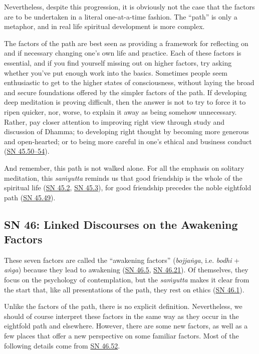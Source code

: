\documentclass[12pt,openany]{book}%
\begin{document}
Nevertheless, despite this progression, it is obviously not the case that the factors are to be undertaken in a literal one-at-a-time fashion. The “path” is only a metaphor, and in real life spiritual development is more complex.

The factors of the path are best seen as providing a framework for reflecting on and if necessary changing one’s own life and practice. Each of these factors is essential, and if you find yourself missing out on higher factors, try asking whether you’ve put enough work into the basics. Sometimes people seem enthusiastic to get to the higher states of consciousness, without laying the broad and secure foundations offered by the simpler factors of the path. If developing deep meditation is proving difficult, then the answer is not to try to force it to ripen quicker, nor, worse, to explain it away as being somehow unnecessary. Rather, pay closer attention to improving right view through study and discussion of Dhamma; to developing right thought by becoming more generous and open-hearted; or to being more careful in one’s ethical and business conduct (\href{https://suttacentral.net/sn45.50}{SN 45.50–54}).

And remember, this path is not walked alone. For all the emphasis on solitary meditation, this \textit{\textsanskrit{saṁyutta}} reminds us that good friendship is the whole of the spiritual life (\href{https://suttacentral.net/sn45.2}{SN 45.2}, \href{https://suttacentral.net/sn45.3}{SN 45.3}), for good friendship precedes the noble eightfold path (\href{https://suttacentral.net/sn45.49}{SN 45.49}).

\subsection*{SN 46: Linked Discourses on the Awakening Factors}

These seven factors are called the “awakening factors” (\textit{\textsanskrit{bojjaṅga}}, i.e. \textit{bodhi} + \textit{\textsanskrit{aṅga}}) because they lead to awakening (\href{https://suttacentral.net/sn46.5}{SN 46.5}, \href{https://suttacentral.net/sn46.21}{SN 46.21}). Of themselves, they focus on the psychology of contemplation, but the \textit{\textsanskrit{saṁyutta}} makes it clear from the start that, like all presentations of the path, they rest on ethics (\href{https://suttacentral.net/sn46.1}{SN 46.1}).

Unlike the factors of the path, there is no explicit definition. Nevertheless, we should of course interpret these factors in the same way as they occur in the eightfold path and elsewhere. However, there are some new factors, as well as a few places that offer a new perspective on some familiar factors. Most of the following details come from \href{https://suttacentral.net/sn46.52}{SN 46.52}.
\end{document}
